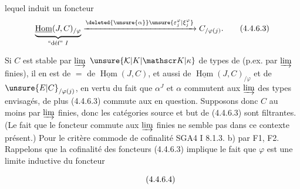 lequel induit un foncteur
\[
\underbrace{\underline{\operatorname{Hom}}(J,C)_{/\varphi}}_{\text{``déf'' }I}
\xrightarrow{\deleted{\unsure{\alpha}}\unsure{\varepsilon_j^{\varphi}|\xi_j^{\varphi}}}
C_{/\varphi(j)}.\tag*{(4.4.6.3)}
\]

Si $C$ est stable par $\varinjlim$    $\unsure{\mathcal K|K|\mathscr K|\kappa}$ de types de   (p.ex. par $\varinjlim$ finies), il en est de $=$ de $\underline{\operatorname{Hom}}(J,C)$, et aussi de $\underline{\operatorname{Hom}}(J,C)_{/\varphi}$ et de $\unsure{E|C}_{/\varphi(j)}$, en vertu du fait que $\alpha^J$ et $\alpha$ commutent aux $\varinjlim$ des types envisagés, de plus (4.4.6.3) commute aux   en question. Supposons donc $C$   au moins par $\varinjlim$ finies, donc  les catégories source et but de (4.4.6.3) sont filtrantes. (Le fait que le foncteur commute aux $\varinjlim$ finies ne semble pas  dans ce contexte présent.)   Pour  le critère commode de cofinalité SGA4 I 8.1.3. b) par \deleted{$\unsure{\varphi}$}F1, \deleted{$\unsure{\varphi}$}F2.
Rappelons que la cofinalité des foncteurs (4.4.6.3)  implique le fait que $\varphi$ est une limite inductive du foncteur 


\[\tag*{(4.4.6.4)}\vphantom{I}\]

